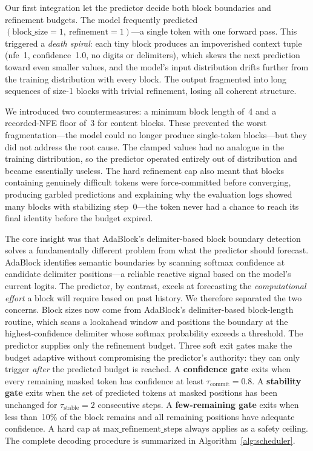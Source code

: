 \documentclass[11pt]{article}
\begin{document}
Our first integration let the predictor decide both block boundaries and refinement budgets. The model frequently predicted \((\text{block\_size}=1,\ \text{refinement}=1)\)---a single token with one forward pass. This triggered a \emph{death spiral}: each tiny block produces an impoverished context tuple (nfe~1, confidence~1.0, no digits or delimiters), which skews the next prediction toward even smaller values, and the model's input distribution drifts further from the training distribution with every block. The output fragmented into long sequences of size-1 blocks with trivial refinement, losing all coherent structure.

We introduced two countermeasures: a minimum block length of~4 and a recorded-NFE floor of~3 for content blocks. These prevented the worst fragmentation---the model could no longer produce single-token blocks---but they did not address the root cause. The clamped values had no analogue in the training distribution, so the predictor operated entirely out of distribution and became essentially useless. The hard refinement cap also meant that blocks containing genuinely difficult tokens were force-committed before converging, producing garbled predictions and explaining why the evaluation logs showed many blocks with stabilizing step~0---the token never had a chance to reach its final identity before the budget expired.

The core insight was that AdaBlock's delimiter-based block boundary detection solves a fundamentally different problem from what the predictor should forecast. AdaBlock identifies semantic boundaries by scanning softmax confidence at candidate delimiter positions---a reliable reactive signal based on the model's current logits. The predictor, by contrast, excels at forecasting the \emph{computational effort} a block will require based on past history. We therefore separated the two concerns. Block sizes now come from AdaBlock's delimiter-based block-length routine, which scans a lookahead window and positions the boundary at the highest-confidence delimiter whose softmax probability exceeds a threshold. The predictor supplies only the refinement budget. Three soft exit gates make the budget adaptive without compromising the predictor's authority: they can only trigger \emph{after} the predicted budget is reached. A \textbf{confidence gate} exits when every remaining masked token has confidence at least \(\tau_{\text{commit}}=0.8\). A \textbf{stability gate} exits when the set of predicted tokens at masked positions has been unchanged for \(\tau_{\text{stable}}=2\) consecutive steps. A \textbf{few-remaining gate} exits when less than~10\% of the block remains and all remaining positions have adequate confidence. A hard cap at \(\text{max\_refinement\_steps}\) always applies as a safety ceiling. The complete decoding procedure is summarized in Algorithm~\ref{alg:scheduler}.
\end{document}
